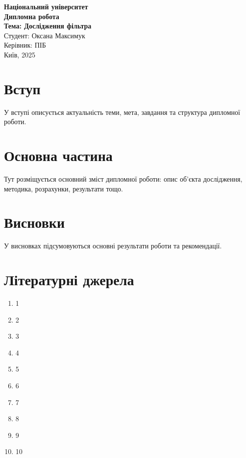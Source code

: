 \documentclass[a4paper,12pt]{report}
\begin{document}
\begin{titlepage}
\centering
\textbf{Національний університет}\\[2cm]
\textbf{Дипломна робота}\\[1.5cm]
\textbf{Тема: Дослідження фільтра}\\[4cm]
Студент: Оксана Максимук \\[0.5cm]
Керівник: ПІБ \\[3cm]
Київ, 2025
\end{titlepage}

\chapter*{Вступ}
У вступі описується актуальність теми, мета, завдання та структура дипломної роботи.

\chapter{Основна частина}
Тут розміщується основний зміст дипломної роботи: опис об’єкта дослідження, 
методика, розрахунки, результати тощо.

\chapter*{Висновки}
У висновках підсумовуються основні результати роботи та рекомендації.

\chapter*{Літературні джерела}
\begin{enumerate}
  \item 1
  \item 2
  \item 3
  \item 4
  \item 5
  \item 6
  \item 7
  \item 8
  \item 9
  \item 10
\end{enumerate}
\end{document}
